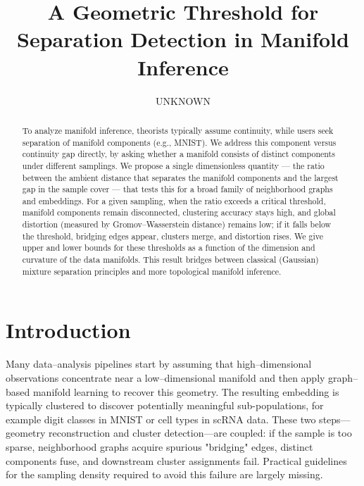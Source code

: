 \documentclass{article}
\author{UNKNOWN}
\title{A Geometric Threshold for Separation Detection in Manifold Inference}
\theoremstyle{plain}
\theoremstyle{definition}
\theoremstyle{remark}
\begin{document}
\maketitle

\begin{abstract}

To analyze manifold inference, theorists typically assume continuity, while users seek separation of manifold components (e.g., MNIST). We address this component versus continuity gap directly, by asking whether a manifold consists of distinct components under different samplings. We propose a single dimensionless quantity — the ratio between the ambient distance that separates the manifold components and the largest gap in the sample cover — that tests this for a broad family of neighborhood graphs and embeddings.  For a given sampling,
when the ratio exceeds a critical threshold, manifold components remain disconnected, clustering accuracy stays high, and global distortion (measured by Gromov–Wasserstein distance) remains low; if it falls below the threshold, bridging edges appear, clusters merge, and distortion rises.  
We give upper and lower bounds for these thresholds as a function of the dimension and curvature of the data manifolds. 
This result bridges between classical (Gaussian) mixture separation principles and more topological manifold inference.

\end{abstract}

\section{Introduction}
\label{sec:introduction}



Many data–analysis pipelines start by assuming that high–dimensional observations concentrate near a low–dimensional manifold and then apply graph–based manifold learning to recover this geometry. The resulting embedding is typically clustered to discover potentially meaningful sub-populations, for example digit classes in MNIST or cell types in scRNA data. These two steps—geometry reconstruction and cluster detection—are coupled: if the sample is too sparse, neighborhood graphs acquire spurious "bridging" edges, distinct components fuse, and downstream cluster assignments fail. Practical guidelines for the sampling density required to avoid this failure are largely missing.
\end{document}
